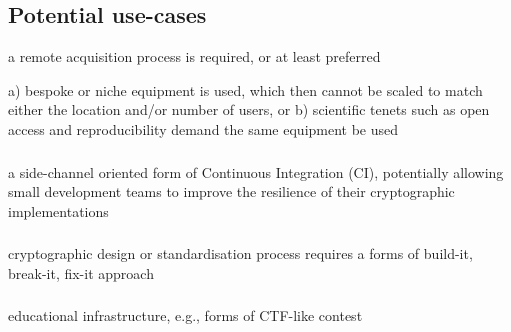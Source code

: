 
\subsection{Potential use-cases}

a remote acquisition process is required, or at least preferred


a) bespoke or niche equipment is used, which then cannot be scaled to 
   match either the location and/or number of users,
   or
b) scientific tenets such as open access and reproducibility demand
   the same equipment be used 


\subsubsection{}
a side-channel oriented form of Continuous Integration (CI), potentially allowing small development teams to improve the resilience of their cryptographic implementations


\subsubsection{}
cryptographic design or standardisation process requires a forms of build-it, break-it, fix-it approach


\subsubsection{}
educational infrastructure, e.g., forms of CTF-like contest

